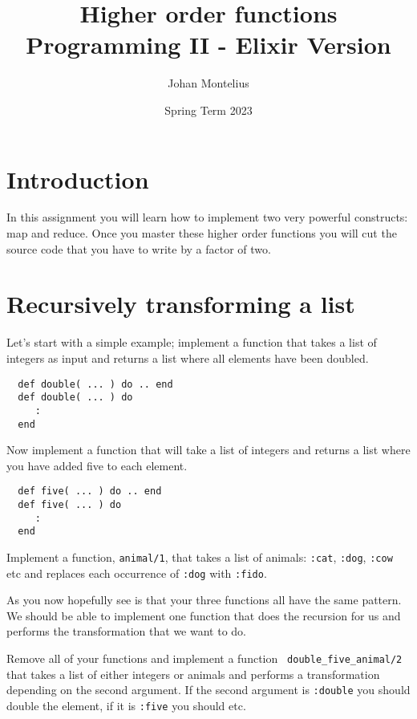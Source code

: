 \documentclass[a4paper,11pt]{article}
\begin{document}
\title{
    \textbf{Higher order functions}\\
    \large{Programming II - Elixir Version}
}
\author{Johan Montelius}
\date{Spring Term 2023}
\maketitle
{}



\section*{Introduction}

In this assignment you will learn how to implement two very powerful
constructs: map and reduce. Once you master these higher order
functions you will cut the source code that you have to write by a
factor of two.

\section*{Recursively transforming a list}

Let's start with a simple example; implement a function that takes a
list of integers as input and returns a list where all elements have
been doubled.

\begin{verbatim}
  def double( ... ) do .. end
  def double( ... ) do
     :
  end
\end{verbatim}

Now implement a function that will take a list of integers and returns
a list where you have added five to each element.

\begin{verbatim}
  def five( ... ) do .. end
  def five( ... ) do
     :
  end
\end{verbatim}

Implement a function, {\tt animal/1}, that takes a list of animals:
{\tt :cat}, {\tt :dog}, {\tt :cow} etc and replaces each occurrence of
{\tt :dog} with {\tt :fido}.

As you now hopefully see is that your three functions all have the
same pattern. We should be able to implement one function that does
the recursion for us and performs the transformation that we want to
do.

Remove all of your functions and implement a function {\tt
  double\_five\_animal/2} that takes a list of either integers or
animals and performs a transformation depending on the second
argument. If the second argument is {\tt :double} you should double
the element, if it is {\tt :five} you should etc.
\end{document}
